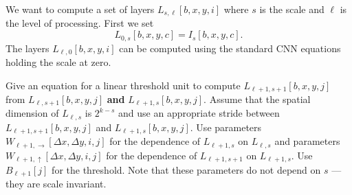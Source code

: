 \documentclass{article}
\begin{document}
We want to compute a set of layers $L_{s,\ell}[b,x,y,i]$ where $s$ is the scale and $\ell$ is the level of processing.  First we set
$$L_{0,s}[b,x,y,c] = I_s[b,x,y,c].$$
The layers $L_{\ell,0}[b,x,y,i]$ can be computed using the standard CNN equations holding the scale at zero.

\medskip
Give an equation for a linear threshold unit to compute $L_{\ell+1,s+1}[b,x,y,j]$ from $L_{\ell,s+1}[b,x,y,j]$ {\bf and} $L_{\ell+1,s}[b,x,y,j]$.  Assume that the
spatial dimension of $L_{\ell,s}$ is $2^{k-s}$ and use an appropriate stride between $L_{\ell+1,s+1}[b,x,y,j]$ and $L_{\ell+1,s}[b,x,y,j]$.  Use parameters
$W_{\ell+1,\rightarrow}[\Delta x, \Delta y, i,j]$ for the dependence of $L_{\ell+1,s}$ on $L_{\ell,s}$ and
parameters
$W_{\ell+1,\uparrow}[\Delta x, \Delta y, i,j]$ for the dependence of $L_{\ell+1,s+1}$ on $L_{\ell+1,s}$.  Use $B_{\ell+1}[j]$ for the threshold.
Note that these parameters do not depend on $s$ --- they are scale invariant.
\end{document}
